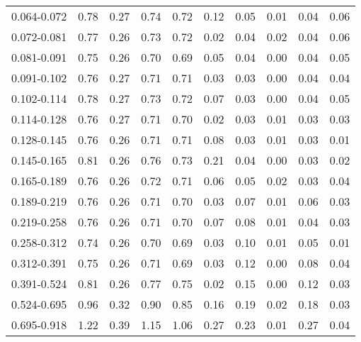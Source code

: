 \begin{table}
\begin{center}
\begin{tabular}{@{}l l l l l l l l l l@{}}
            0.064-0.072     &  0.78   &  0.27   &  0.74         &  0.72      &  0.12    &  0.05  &  0.01       &  0.04  &  0.06  \\
            0.072-0.081     &  0.77   &  0.26   &  0.73         &  0.72      &  0.02    &  0.04  &  0.02       &  0.04  &  0.06  \\
            0.081-0.091     &  0.75   &  0.26   &  0.70         &  0.69      &  0.05    &  0.04  &  0.00       &  0.04  &  0.05  \\
            0.091-0.102     &  0.76   &  0.27   &  0.71         &  0.71      &  0.03    &  0.03  &  0.00       &  0.04  &  0.04  \\
            0.102-0.114     &  0.78   &  0.27   &  0.73         &  0.72      &  0.07    &  0.03  &  0.00       &  0.04  &  0.05  \\
            0.114-0.128     &  0.76   &  0.27   &  0.71         &  0.70      &  0.02    &  0.03  &  0.01       &  0.03  &  0.03  \\
            0.128-0.145     &  0.76   &  0.26   &  0.71         &  0.71      &  0.08    &  0.03  &  0.01       &  0.03  &  0.01  \\
            0.145-0.165     &  0.81   &  0.26   &  0.76         &  0.73      &  0.21    &  0.04  &  0.00       &  0.03  &  0.02  \\
            0.165-0.189     &  0.76   &  0.26   &  0.72         &  0.71      &  0.06    &  0.05  &  0.02       &  0.03  &  0.04  \\
            0.189-0.219     &  0.76   &  0.26   &  0.71         &  0.70      &  0.03    &  0.07  &  0.01       &  0.06  &  0.03  \\
            0.219-0.258     &  0.76   &  0.26   &  0.71         &  0.70      &  0.07    &  0.08  &  0.01       &  0.04  &  0.03  \\
            0.258-0.312     &  0.74   &  0.26   &  0.70         &  0.69      &  0.03    &  0.10  &  0.01       &  0.05  &  0.01  \\
            0.312-0.391     &  0.75   &  0.26   &  0.71         &  0.69      &  0.03    &  0.12  &  0.00       &  0.08  &  0.04  \\
            0.391-0.524     &  0.81   &  0.26   &  0.77         &  0.75      &  0.02    &  0.15  &  0.00       &  0.12  &  0.03  \\
            0.524-0.695     &  0.96   &  0.32   &  0.90         &  0.85      &  0.16    &  0.19  &  0.02       &  0.18  &  0.03  \\
            0.695-0.918     &  1.22   &  0.39   &  1.15         &  1.06      &  0.27    &  0.23  &  0.01       &  0.27  &  0.04  \\

\end{tabular}
\end{center}
\end{table}
